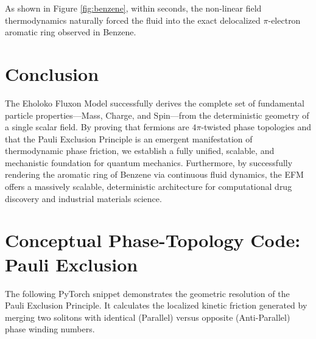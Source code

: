\documentclass[11pt, twoside]{article}
\begin{document}
As shown in Figure \ref{fig:benzene}, within seconds, the non-linear field thermodynamics naturally forced the fluid into the exact delocalized $\pi$-electron aromatic ring observed in Benzene. 

\section{Conclusion}
The Eholoko Fluxon Model successfully derives the complete set of fundamental particle properties—Mass, Charge, and Spin—from the deterministic geometry of a single scalar field. By proving that fermions are $4\pi$-twisted phase topologies and that the Pauli Exclusion Principle is an emergent manifestation of thermodynamic phase friction, we establish a fully unified, scalable, and mechanistic foundation for quantum mechanics. Furthermore, by successfully rendering the aromatic ring of Benzene via continuous fluid dynamics, the EFM offers a massively scalable, deterministic architecture for computational drug discovery and industrial materials science.

\newpage
\appendix
\section{Conceptual Phase-Topology Code: Pauli Exclusion}

The following PyTorch snippet demonstrates the geometric resolution of the Pauli Exclusion Principle. It calculates the localized kinetic friction generated by merging two solitons with identical (Parallel) versus opposite (Anti-Parallel) phase winding numbers.
\end{document}
